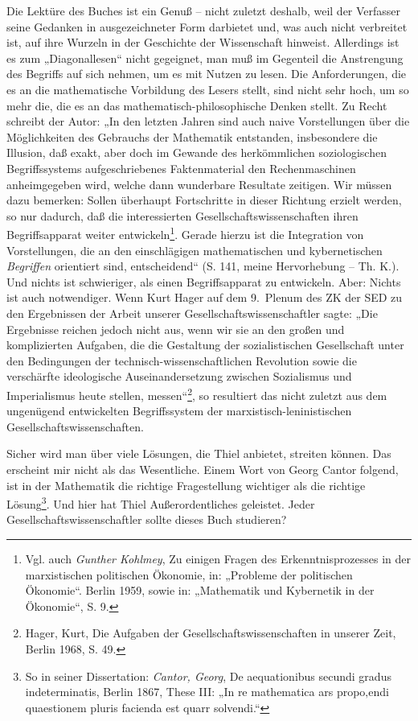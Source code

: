 ﻿\documentclass[11pt,a4paper]{article}
\begin{document}
Die Lektüre des Buches ist ein Genuß -- nicht zuletzt deshalb, weil der
Verfasser seine Gedanken in ausgezeichneter Form darbietet und, was auch nicht
verbreitet ist, auf ihre Wurzeln in der Geschichte der Wissenschaft hinweist.
Allerdings ist es zum „Diagonallesen“ nicht gegeignet, man muß im Gegenteil
die Anstrengung des Begriffs auf sich nehmen, um es mit Nutzen zu lesen. Die
Anforderungen, die es an die mathematische Vorbildung des Lesers stellt, sind
nicht sehr hoch, um so mehr die, die es an das mathematisch-philosophische
Denken stellt. Zu Recht schreibt der Autor: „In den letzten Jahren sind auch
naive Vorstellungen über die Möglichkeiten des Gebrauchs der Mathematik
entstanden, insbesondere die Illusion, daß exakt, aber doch im Gewande des
herkömmlichen soziologischen Begriffssystems aufgeschriebenes Faktenmaterial
den Rechenmaschinen anheimgegeben wird, welche dann wunderbare Resultate
zeitigen. Wir müssen dazu bemerken: Sollen überhaupt Fortschritte in dieser
Richtung erzielt werden, so nur dadurch, daß die interessierten
Gesellschaftswissenschaften ihren Begriffsapparat weiter
entwickeln\footnote{Vgl. auch \emph{Gunther Kohlmey}, Zu einigen Fragen des
  Erkenntnisprozesses in der marxistischen politischen Ökonomie, in: „Probleme
  der politischen Ökonomie“. Berlin 1959, sowie in: „Mathematik und Kybernetik
  in der Ökonomie“, S. 9.}. Gerade hierzu ist die Integration von
Vorstellungen, die an den einschlägigen mathematischen und kybernetischen
\emph{Begriffen} orientiert sind, entscheidend“ (S. 141, meine Hervorhebung --
Th. K.). Und nichts ist schwieriger, als einen Begriffsapparat zu
entwickeln. Aber: Nichts ist auch notwendiger. Wenn Kurt Hager auf dem
9.~Plenum des ZK der SED zu den Ergebnissen der Arbeit unserer
Gesellschaftswissenschaftler sagte: „Die Ergebnisse reichen jedoch nicht aus,
wenn wir sie an den großen und komplizierten Aufgaben, die die Gestaltung der
sozialistischen Gesellschaft unter den Bedingungen der
technisch-wissenschaftlichen Revolution sowie die verschärfte ideologische
Auseinandersetzung zwischen Sozialismus und Imperialismus heute stellen,
messen“\footnote{ Hager, Kurt, Die Aufgaben der Gesellschaftswissenschaften in
  unserer Zeit, Berlin 1968, S. 49.}, so resultiert das nicht zuletzt aus dem
ungenügend entwickelten Begriffssystem der marxistisch-leninistischen
Gesellschaftswissenschaften.

Sicher wird man über viele Lösungen, die Thiel anbietet, streiten können. Das
erscheint mir nicht als das Wesentliche. Einem Wort von Georg Cantor folgend,
ist in der Mathematik die richtige Fragestellung wichtiger als die richtige
Lösung\footnote{So in seiner Dissertation: \emph{Cantor, Georg}, De
  aequationibus secundi gradus indeterminatis, Berlin 1867, These III: „In re
  mathematica ars propo‚endi quaestionem pluris facienda est quarr
  solvendi.“}.  Und hier hat Thiel Außerordentliches geleistet. Jeder
Gesellschaftswissenschaftler sollte dieses Buch studieren?
\end{document}
